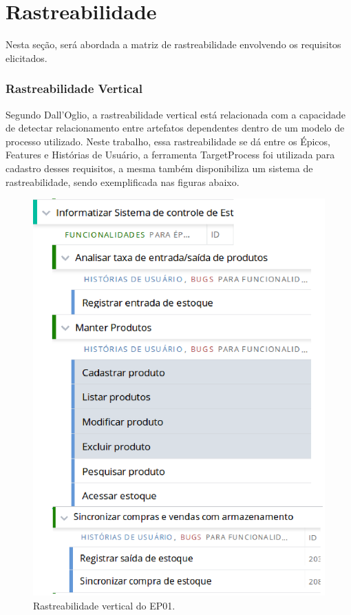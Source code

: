\chapter{Rastreabilidade}

Nesta seção, será abordada a matriz de rastreabilidade envolvendo os requisitos elicitados.

\subsection{Rastreabilidade Vertical}
Segundo Dall'Oglio, a rastreabilidade vertical está relacionada com a capacidade de detectar relacionamento entre artefatos dependentes dentro de um modelo de processo utilizado. Neste trabalho, essa rastreabilidade se dá entre os Épicos, Features e Histórias de Usuário, a ferramenta TargetProcess foi utilizada para cadastro desses requisitos, a mesma também disponibiliza um sistema de rastreabilidade, sendo exemplificada nas figuras abaixo.


\begin{figure}[!htpb]
\centering
\includegraphics[scale=0.4]{figuras/processo/epico1}
\caption{Rastreabilidade vertical do EP01.}
\end{figure}


